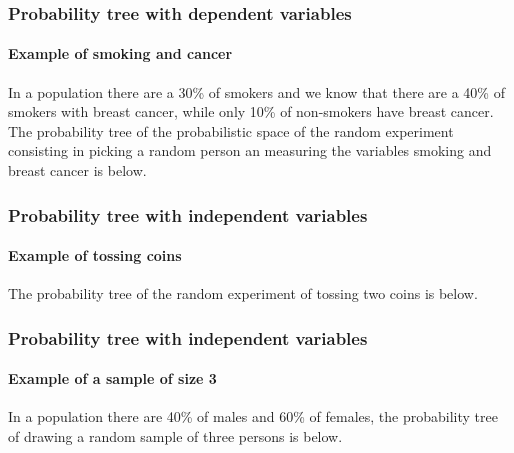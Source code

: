 \begin{frame}
\frametitle{Probability tree with dependent variables}
\framesubtitle{Example of smoking and cancer}
In a population there are a 30\% of smokers and we know that there are a 40\% of smokers with breast cancer, while only
10\% of non-smokers have breast cancer. 
The probability tree of the probabilistic space of the random experiment consisting in picking a random person an
measuring the variables smoking and breast cancer is below.  
\begin{center}
\end{center}
\end{frame}


\begin{frame}
\frametitle{Probability tree with independent variables}
\framesubtitle{Example of tossing coins}
The probability tree of the random experiment of tossing two coins is below.
\begin{center}
\end{center}
\end{frame}


\begin{frame}
\frametitle{Probability tree with independent variables}
\framesubtitle{Example of a sample of size 3}
In a population there are 40\% of males and 60\% of females, the probability tree of drawing a random sample of three
persons is below.
\begin{center}
\end{center}
\end{frame}


